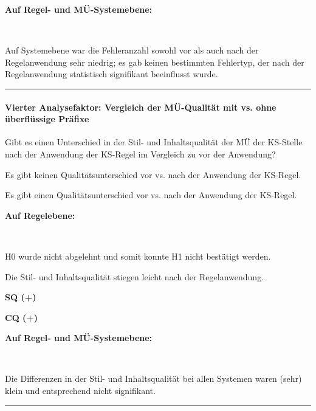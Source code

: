 \noindent
\parbox[t]{.8\textwidth}{\textbf{Auf Regel- und MÜ-Systemebene:}}\\
\parbox[t]{.8\textwidth}{
Auf Systemebene war die Fehleranzahl sowohl vor als auch nach der Regelanwendung sehr niedrig; es gab keinen bestimmten Fehlertyp, der nach der Regelanwendung statistisch signifikant beeinflusst wurde.
}
\parbox[t]{.04\textwidth}{}
\parbox[t]{.15\textwidth}{}
\smallskip
\hrule

\newpage
\paragraph*{Vierter Analysefaktor: Vergleich der MÜ-Qualität mit vs. ohne überflüssige Präfixe}
\begin{description}[font=\normalfont\bfseries]
\item [Fragestellung:] Gibt es einen Unterschied in der Stil- und Inhaltsqualität der MÜ der KS-Stelle nach der Anwendung der KS-Regel im Vergleich zu vor der Anwendung?
\item [H0 --] Es gibt keinen Qualitätsunterschied vor vs. nach der Anwendung der KS-Regel.
\item [H1 --] Es gibt einen Qualitätsunterschied vor vs. nach der Anwendung der KS-Regel.
\item [Resultat]
\end{description}
\noindent
\parbox[t]{.8\textwidth}{\textbf{Auf Regelebene:}}\\
\parbox[t]{.8\textwidth}{
H0 wurde nicht abgelehnt und somit konnte H1 nicht bestätigt werden.

Die Stil- und Inhaltsqualität stiegen leicht nach der Regelanwendung.
}
\parbox[t]{.04\textwidth}{}
\parbox[t]{.15\textwidth}{
{ \textbf{SQ (+)}}

 \textbf{CQ (+)}
}

\noindent
\parbox[t]{.8\textwidth}{\textbf{Auf Regel- und MÜ-Systemebene:}}\\
\parbox[t]{.8\textwidth}{
Die Differenzen in der Stil- und Inhaltsqualität bei allen Systemen waren (sehr) klein und entsprechend nicht signifikant.
}
\parbox[t]{.04\textwidth}{}
\parbox[t]{.15\textwidth}{}
\smallskip
\hrule
